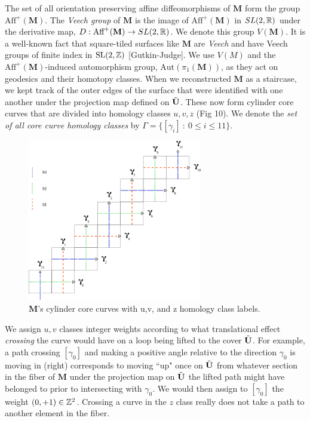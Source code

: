 \documentclass[]{article}
\def\bM{\mathbf{M}}
\begin{document}
The set of all orientation preserving affine diffeomorphisms of $\bM$ form the group $\text{Aff}^+(\bM)$. The \emph{Veech group} of $\bM$ is the image of $\text{Aff}^+(\bM)$ in $SL(2,\mathbb{R})$ under the derivative map, $D:\text{Aff}^+(\bM)\rightarrow SL(2,\RR)$. We denote this group $V(\bM)$. It is a well-known fact that square-tiled surfaces like $\bM$ are \emph{Veech} and have Veech groups of finite index in $\mathrm{SL}(2,\mathbb{Z})$ [Gutkin-Judge]. We use $V(M)$ and the $\text{Aff}^+(\bM)$-induced automorphism group, $\text{Aut}(\pi_1(\bM))$, as they act on geodesics and their homotopy classes. When we reconstructed $\bM$ as a staircase, we kept track of the outer edges of the surface that were identified with one another under the projection map defined on $\tilde{\mathbf{U}}$. These now form cylinder core curves that are divided into homology classes $u,v,z$ (Fig 10). We denote the \emph{set of all core curve homology classes} by $\Gamma=\{[\gamma_i]~:~0\leq i \leq 11\}$.

\begin{figure}[H]
\includegraphics[width=3in]{homologyclass.png}
\centering
\caption{$\bM$'s cylinder core curves with u,v, and z homology class labels.}
\label{fig:homology}
\end{figure}

We assign $u,v$ classes integer weights according to what translational effect \emph{crossing} the curve would have on a loop being lifted to the cover $\tilde{\mathbf{U}}$. For example, a path crossing $[\gamma_0]$ and making a positive angle relative to the direction $\gamma_0$ is moving in (right) corresponds to moving ``up" once on $\tilde{\mathbf{U}}$ from whatever section in the fiber of $\bM$ under the projection map on $\tilde{\mathbf{U}}$ the lifted path might have belonged to prior to intersecting with $\gamma_0$. We would then assign to $[\gamma_0]$ the weight $(0,+1)\in\mathbb{Z}^2$. Crossing a curve in the $z$ class really does not take a path to another element in the fiber.
\end{document}
